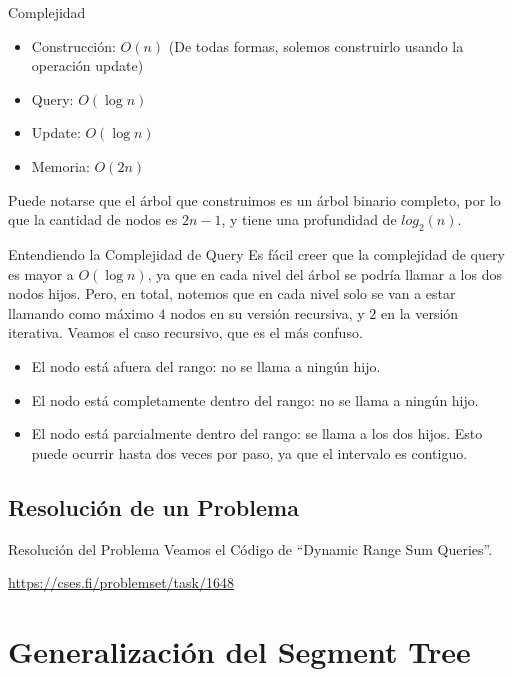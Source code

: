 \documentclass{beamer}
\begin{document}
\begin{frame}{Complejidad}
\begin{itemize}
    \item Construcción: $O(n)$ (De todas formas, solemos construirlo usando la operación update)
    \item Query: $O(\log n)$
    \item Update: $O(\log n)$
    \item Memoria: $O(2n)$
\end{itemize}
Puede notarse que el árbol que construimos es un árbol binario completo, por lo que la cantidad de nodos es $2n-1$, y tiene una profundidad de $log_2(n)$.
\end{frame}

\begin{frame}{Entendiendo la Complejidad de Query}
Es fácil creer que la complejidad de query es mayor a $O(\log n)$, ya que en cada nivel del árbol se podría llamar a los dos nodos hijos. Pero, en total, notemos que en cada nivel solo se van a estar llamando como máximo $4$ nodos en su versión recursiva, y $2$ en la versión iterativa. Veamos el caso recursivo, que es el más confuso.

\begin{itemize}
    \item El nodo está afuera del rango: no se llama a ningún hijo.
    \item El nodo está completamente dentro del rango: no se llama a ningún hijo.
    \item El nodo está parcialmente dentro del rango: se llama a los dos hijos. Esto puede ocurrir hasta dos veces por paso, ya que el intervalo es contiguo.
\end{itemize}
\end{frame}

\subsection{Resolución de un Problema}

\begin{frame}{Resolución del Problema}
Veamos el Código de ``Dynamic Range Sum Queries''.

\url{https://cses.fi/problemset/task/1648}
\end{frame}

\section{Generalización del Segment Tree}
\end{document}
